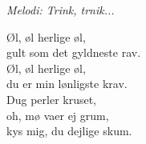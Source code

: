 {\footnotesize\textit{Melodi: Trink, trnik...}}\par
\vspace{10pt}
Øl, øl herlige øl,\\
gult som det gyldneste rav.\\
Øl, øl herlige øl,\\
du er min lønligste krav.\\
\revrpt Dug perler kruset,\\
oh, mø vaer ej grum,\\
kys mig, du dejlige skum.\rpt
